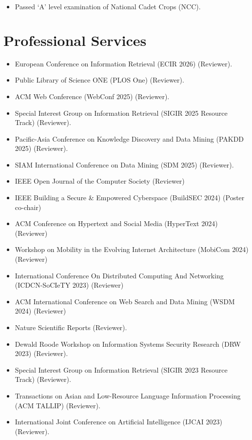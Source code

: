 \documentclass[margin, centered,lmodern]{res}
\begin{document}
\begin{resume}
\begin{itemize}[leftmargin=*]
 \item Passed `A' level examination of National Cadet Crops (NCC).
\end{itemize}

\section{Professional Services}
\begin{itemize}[leftmargin=*]
\item European Conference on Information Retrieval (ECIR 2026) (Reviewer).
\item Public Library of Science ONE (PLOS One) (Reviewer).
\item ACM Web Conference (WebConf 2025) (Reviewer).
\item Special Interest Group on Information Retrieval (SIGIR 2025 Resource Track) (Reviewer).
\item Pacific-Asia Conference on Knowledge Discovery and Data Mining (PAKDD 2025) (Reviewer).
\item SIAM International Conference on Data Mining (SDM 2025) (Reviewer).
\item IEEE Open Journal of the Computer Society (Reviewer)
\item IEEE Building a Secure \& Empowered Cyberspace (BuildSEC 2024) (Poster co-chair)
\item ACM Conference on Hypertext and Social Media (HyperText 2024) (Reviewer)
\item Workshop on Mobility in the Evolving Internet Architecture (MobiCom 2024) (Reviewer)
\item International Conference On Distributed Computing And Networking (ICDCN-SoCIeTY 2023) (Reviewer)
\item ACM International Conference on Web Search and Data Mining (WSDM 2024) (Reviewer)
\item Nature Scientific Reports (Reviewer).
\item Dewald Roode Workshop on Information Systems Security Research (DRW 2023) (Reviewer).
\item Special Interest Group on Information Retrieval (SIGIR 2023 Resource Track) (Reviewer).
\item Transactions on Asian and Low-Resource Language Information Processing (ACM TALLIP) (Reviewer).
\item International Joint Conference on Artificial Intelligence (IJCAI 2023) (Reviewer).

\end{itemize}
\end{resume}
\end{document}
